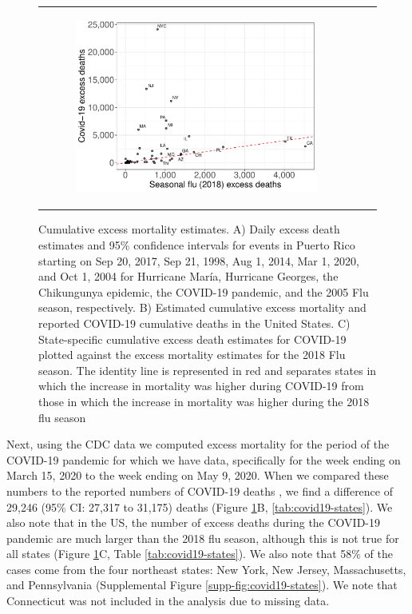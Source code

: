 \documentclass[11pt]{article}
\begin{document}
\begin{figure}[ht]
\begin{tabular}{lll}
\begin{subfigure}[t]{0.3\linewidth}
		\includegraphics[width=1\linewidth]{figs/figure-2c.pdf}
	\end{subfigure}\\
	\end{tabular}
    \caption{Cumulative excess mortality estimates. A) Daily excess death estimates and 95\% confidence intervals for events in Puerto Rico starting on Sep 20, 2017, Sep 21, 1998, Aug 1, 2014, Mar 1, 2020, and Oct 1, 2004 for Hurricane Mar\'ia, Hurricane Georges, the Chikungunya epidemic, the COVID-19 pandemic, and the 2005 Flu season, respectively.  B) Estimated cumulative excess mortality and reported COVID-19 cumulative deaths in the United States. C) State-specific cumulative excess death estimates for COVID-19 plotted against the excess mortality estimates for the 2018 Flu season. The identity line is represented in red and separates states in which the increase in mortality was higher during COVID-19 from those in which the increase in mortality was higher during the 2018 flu season}
    \label{fig:excess-deaths}
\end{figure}

Next, using the CDC data we computed excess mortality for the period of the COVID-19 pandemic for which we have data, specifically for the week ending on March 15, 2020 to the week ending on May 9, 2020. When we compared these numbers to the reported numbers of COVID-19 deaths \cite{smith2020coronavirus}, we find a difference of 29,246 (95\% CI: 27,317 to 31,175) deaths (Figure \ref{fig:excess-deaths}B, \ref{tab:covid19-states}). We also note that in the US, the number of excess deaths during the COVID-19 pandemic are much larger than the 2018 flu season, although this is not true for all states (Figure \ref{fig:excess-deaths}C, Table \ref{tab:covid19-states}). We also note that 58\% of the cases come from the four northeast states: New York, New Jersey, Massachusetts, and Pennsylvania (Supplemental Figure \ref{supp-fig:covid19-states}). We note that Connecticut was not included in the analysis due to missing data.
\end{document}
